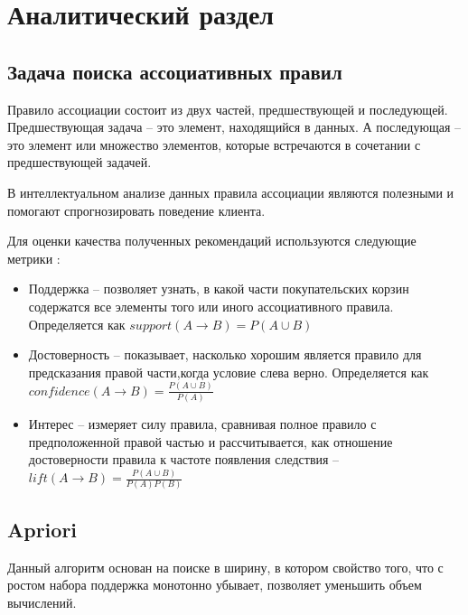 \section{Аналитический раздел}

\subsection{Задача поиска ассоциативных правил}

Правило ассоциации состоит из двух частей, предшествующей и последующей. Предшествующая задача -- это элемент, находящийся в данных. А последующая -- это элемент или множество элементов, которые встречаются в сочетании с предшествующей задачей. \cite{sr1}

В интеллектуальном анализе данных правила ассоциации являются полезными и помогают спрогнозировать поведение клиента.

Для оценки качества полученных рекомендаций используются следующие метрики \cite{sr1}:

\begin{itemize}
	\item Поддержка -- позволяет узнать, в какой части покупательских корзин содержатся все элементы того или иного ассоциативного правила. Определяется как $support(A \rightarrow B) = P(A \cup B)$
	\item Достоверность -- показывает, насколько хорошим является правило для предсказания правой части,когда условие слева верно. Определяется как $confidence(A \rightarrow B) = \frac{P(A \cup B)}{P(A)}$
	\item Интерес -- измеряет силу правила, сравнивая полное правило с предположенной правой частью и рассчитывается, как отношение достоверности правила к частоте появления следствия -- $lift(A \rightarrow B) = \frac{P(A \cup B)}{P(A)P(B)}$
\end{itemize}

\subsection{Apriori}

Данный алгоритм основан на поиске в ширину, в котором свойство того, что с ростом набора поддержка монотонно убывает, позволяет уменьшить объем вычислений.

